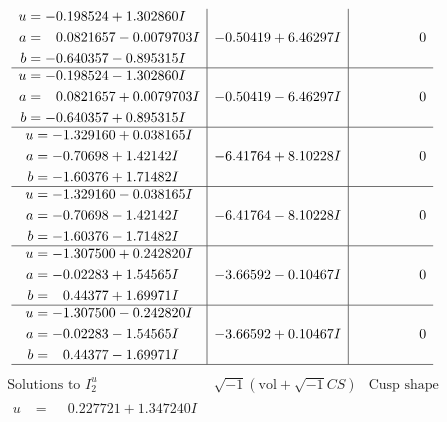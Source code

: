 \documentclass[1p]{elsarticle_modified}
\theoremstyle{definition}
\newcommand{\I}{\sqrt{-1}}
\begin{document}
$$\begin{array}{c|c|c}
\begin{aligned}
u &= -0.198524 + 1.302860 I \\
a &= \phantom{-}0.0821657 - 0.0079703 I \\
b &= -0.640357 - 0.895315 I\end{aligned}
 & -0.50419 + 6.46297 I & \phantom{-0.000000 } 0 \\ \hline\begin{aligned}
u &= -0.198524 - 1.302860 I \\
a &= \phantom{-}0.0821657 + 0.0079703 I \\
b &= -0.640357 + 0.895315 I\end{aligned}
 & -0.50419 - 6.46297 I & \phantom{-0.000000 } 0 \\ \hline\begin{aligned}
u &= -1.329160 + 0.038165 I \\
a &= -0.70698 + 1.42142 I \\
b &= -1.60376 + 1.71482 I\end{aligned}
 & -6.41764 + 8.10228 I & \phantom{-0.000000 } 0 \\ \hline\begin{aligned}
u &= -1.329160 - 0.038165 I \\
a &= -0.70698 - 1.42142 I \\
b &= -1.60376 - 1.71482 I\end{aligned}
 & -6.41764 - 8.10228 I & \phantom{-0.000000 } 0 \\ \hline\begin{aligned}
u &= -1.307500 + 0.242820 I \\
a &= -0.02283 + 1.54565 I \\
b &= \phantom{-}0.44377 + 1.69971 I\end{aligned}
 & -3.66592 - 0.10467 I & \phantom{-0.000000 } 0 \\ \hline\begin{aligned}
u &= -1.307500 - 0.242820 I \\
a &= -0.02283 - 1.54565 I \\
b &= \phantom{-}0.44377 - 1.69971 I\end{aligned}
 & -3.66592 + 0.10467 I & \phantom{-0.000000 } 0\\
 \hline 
 \end{array}$$\newpage$$\begin{array}{c|c|c}  
\text{Solutions to }I^u_{2}& \I (\text{vol} + \sqrt{-1}CS) & \text{Cusp shape}\\
 \hline 
\begin{aligned}
u &= \phantom{-}0.227721 + 1.347240 I \\

\end{aligned}
\end{array}$$
\end{document}
